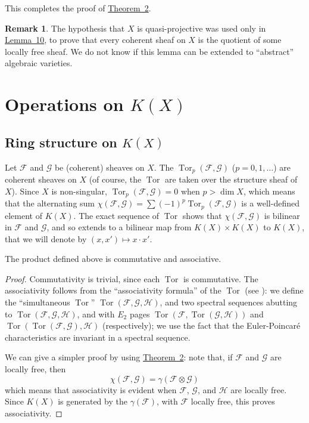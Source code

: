 \documentclass{article}
\theoremstyle{plain}
\newenvironment{proposition}[1]
    {\renewcommand\theinnerproposition{#1}\innerproposition}
    {\endinnerproposition}
\theoremstyle{definition}
\newtheorem*{remark}{Remark}
\newcommand{\scr}[1]{{\mathscr{#1}}}
\DeclareMathOperator{\Tor}{Tor}
\newcommand{\oldpage}[1]{\marginpar{\footnotesize$\Big\vert$ \textit{p.~#1}}}
\begin{document}
This completes the proof of \hyperref[theorem2]{Theorem~2}.

\begin{remark}
  The hypothesis that $X$ is quasi-projective was used only in \hyperref[lemma10]{Lemma~10}, to prove that every coherent sheaf on $X$ is the quotient of some locally free sheaf.
  We do not know if this lemma can be extended to ``abstract'' algebraic varieties.
\end{remark}


\section{Operations on \texorpdfstring{$K(X)$}{K(X)}}
\label{section5}

\subsection{Ring structure on \texorpdfstring{$K(X)$}{K(X)}}
\label{subsection5a}

Let $\scr{F}$ and $\scr{G}$ be (coherent) sheaves on $X$.
The $\Tor_p(\scr{F},\scr{G})$ ($p=0,1,\ldots$) are coherent sheaves on $X$ (of course, the $\Tor$
\oldpage{109}
are taken over the structure sheaf of $X$).
Since $X$ is non-singular, $\Tor_p(\scr{F},\scr{G})=0$ when $p>\dim X$, which means that the alternating sum $\chi(\scr{F},\scr{G})=\sum(-1)^p\Tor_p(\scr{F},\scr{G})$ is a well-defined element of $K(X)$.
The exact sequence of $\Tor$ shows that $\chi(\scr{F},\scr{G})$ is bilinear in $\scr{F}$ and $\scr{G}$, and so extends to a bilinear map from $K(X)\times K(X)$ to $K(X)$, that we will denote by $(x,x')\mapsto x\cdot x'$.

\begin{proposition}{6}
\label{proposition6}
  The product defined above is commutative and associative.
\end{proposition}

\begin{proof}
  Commutativity is trivial, since each $\Tor$ is commutative.
  The associativity follows from the ``associativity formula'' of the $\Tor$ (see \cite{3}):
  we define the ``simultaneous $\Tor$'' $\Tor(\scr{F},\scr{G},\scr{H})$, and two spectral sequences abutting to $\Tor(\scr{F},\scr{G},\scr{H})$, and with $E_2$ pages $\Tor(\scr{F},\Tor(\scr{G},\scr{H}))$ and $\Tor(\Tor(\scr{F},\scr{G}),\scr{H})$ (respectively);
  we use the fact that the Euler-Poincar\'{e} characteristics are invariant in a spectral sequence.

  We can give a simpler proof by using \hyperref[theorem2]{Theorem~2}:
  note that, if $\scr{F}$ and $\scr{G}$ are locally free, then
  \[
    \chi(\scr{F},\scr{G}) = \gamma(\scr{F}\otimes\scr{G})
  \]
  which means that associativity is evident when $\scr{F}$, $\scr{G}$, and $\scr{H}$ are locally free.
  Since $K(X)$ is generated by the $\gamma(\scr{F})$, with $\scr{F}$ locally free, this proves associativity.
\end{proof}
\end{document}
